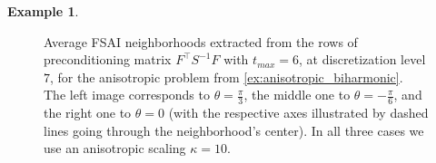 \documentclass[a4paper]{article}
\theoremstyle{plain}
\theoremstyle{definition}
\newtheorem{example}{Example}[section]
\theoremstyle{remark}
\begin{document}
\begin{example}
\begin{figure}[tbhp]
		
		\caption{Average FSAI neighborhoods extracted from the rows of preconditioning matrix \(F^{\top} S^{-1} F\) with \(t_{max} = 6\), at discretization level \(7\), for the anisotropic problem from \cref{ex:anisotropic_biharmonic}. The left image corresponds to \(\theta = \frac{\pi}{3}\), the middle one to \(\theta = -\frac{\pi}{6}\), and the right one to \(\theta=0\) (with the respective axes illustrated by dashed lines going through the neighborhood's center). In all three cases we use an anisotropic scaling \(\kappa = 10\).}
		\label{fig:anisotropic_adaptive_fsai}
	\end{figure}
	
\end{example}
\end{document}
